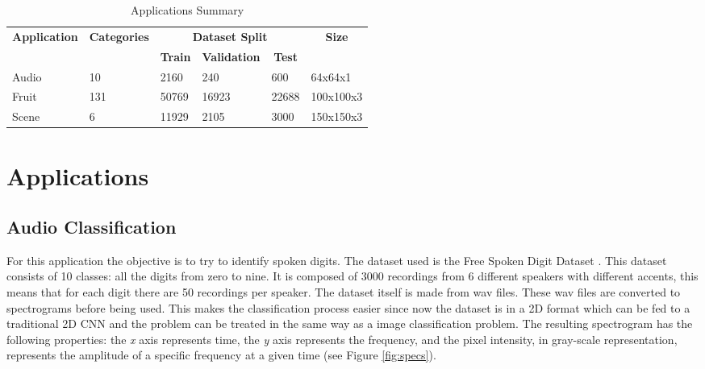 \begin{table}[thbp]
\centering
\caption{Applications Summary}
\label{tab:app_summary}
\begin{tabular}{|l|l|l|l|l|l|}
\hline
\multicolumn{1}{|c|}{\multirow{2}{*}{\textbf{Application}}} & \multicolumn{1}{c|}{\multirow{2}{*}{\textbf{Categories}}} & \multicolumn{3}{c|}{\textbf{Dataset Split}}                                                       & \multicolumn{1}{c|}{\multirow{2}{*}{\textbf{Size}}} \\ \cline{3-5}
\multicolumn{1}{|c|}{}                             & \multicolumn{1}{c|}{}                            & \multicolumn{1}{c|}{\textbf{Train}} & \multicolumn{1}{c|}{\textbf{Validation}} & \multicolumn{1}{c|}{\textbf{Test}} & \multicolumn{1}{c|}{}                      \\ \hline
Audio                                              & 10                                               & 2160                       & 240                             & 600                       & 64x64x1                                    \\ \hline
Fruit                                              & 131                                              & 50769                      & 16923                           & 22688                     & 100x100x3                                  \\ \hline
Scene                                              & 6                                                & 11929                      & 2105                            & 3000                      & 150x150x3                                  \\ \hline
\end{tabular}
\end{table}

\section{Applications}

\subsection{Audio Classification}

For this application the objective is to try to identify spoken digits. The dataset used is the Free Spoken Digit Dataset \cite{fsdd}. This dataset consists of 10 classes: all the digits from zero to nine. It is composed of 3000 recordings from 6 different speakers with different accents, this means that for each digit there are 50 recordings per speaker. The dataset itself is made from wav files. These wav files are converted to spectrograms before being used. This makes the classification process easier since now the dataset is in a 2D format which can be fed to a traditional 2D CNN and the problem can be treated in the same way as a image classification problem. The resulting spectrogram has the following properties: the \textit{x} axis represents time, the \textit{y} axis represents the frequency, and the pixel intensity, in gray-scale representation, represents the amplitude of a specific frequency at a given time (see Figure \ref{fig:specs}).

